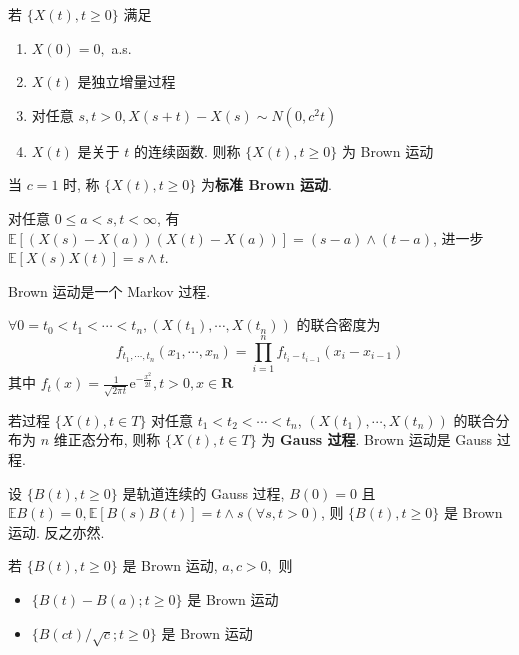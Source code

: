 \documentclass[10pt]{yerbaformat}
\begin{document}
\begin{definition}
    若 $\{X(t), t \geq 0\}$ 满足
    \begin{enumerate}
        \item $X(0)=0,$ a.s.
        \item $X(t)$ 是独立增量过程
        \item 对任意 $s, t>0, X(s+t)-X(s) \sim N\left(0, c^{2} t\right)$
        \item $X(t)$ 是关于 $t$ 的连续函数. 则称 $\{X(t), t \geq 0\}$ 为 Brown 运动
    \end{enumerate}
    当 $c=1$ 时, 称 $\{X(t), t \geq 0\}$ 为\textbf{标准 Brown 运动}.
\end{definition}

\begin{theorem}
    对任意 $0 \leq a<s, t<\infty$, 有$\mathbb{E}[(X(s)-X(a))(X(t)-X(a))]=(s-a) \wedge(t-a)$, 进一步 $\mathbb{E}[X(s) X(t)]=s \wedge t$.
\end{theorem}

\begin{theorem}
    Brown 运动是一个 Markov 过程.
\end{theorem}

\begin{theorem}[有限维分布]
    $\forall 0=t_{0}<t_{1}<\cdots<t_{n},\left(X\left(t_{1}\right), \cdots, X\left(t_{n}\right)\right)$ 的联合密度为 $$f_{t_{1}, \cdots, t_{n}}\left(x_{1}, \cdots, x_{n}\right)=\prod_{i=1}^{n} f_{t_{i}-t_{i-1}}\left(x_{i}-x_{i-1}\right)$$ 其中 $f_{t}(x)=\frac{1}{\sqrt{2 \pi t}} \mathrm{e}^{-\frac{x^{2}}{2 t}}, t>0, x \in \mathbf{R}$
\end{theorem}

\begin{definition}[Gauss 过程]
    若过程 $\{X(t), t \in T\}$ 对任意 $t_{1}<t_{2}<\cdots<t_{n}$, $
        \left(X\left(t_{1}\right), \cdots, X\left(t_{n}\right)\right)$ 的联合分布为 $n$ 维正态分布, 则称 $\{X(t), t \in T\}$ 为 \textbf{Gauss 过程}. Brown 运动是 Gauss 过程.
\end{definition}

\begin{theorem}
    设 $\{B(t), t \geq 0\}$ 是轨道连续的 Gauss 过程, $B(0)=0$ 且 $ \mathbb{E} B(t)=0, \mathbb{E}[B(s) B(t)]=t \wedge s(\forall s, t>0)$, 则 $\{B(t), t \geq 0\}$ 是 Brown 运动. 反之亦然.
\end{theorem}

\begin{theorem}[不变性]
    若 $\{B(t), t \geq 0\}$ 是 Brown 运动, $a, c>0,$ 则
    \begin{itemize}
        \item $\{B(t)-B(a) ; t \geq 0\}$ 是 Brown 运动
        \item $\{B(c t) / \sqrt{c} ; t \geq 0\}$ 是 Brown 运动
    \end{itemize}
\end{theorem}
\end{document}
